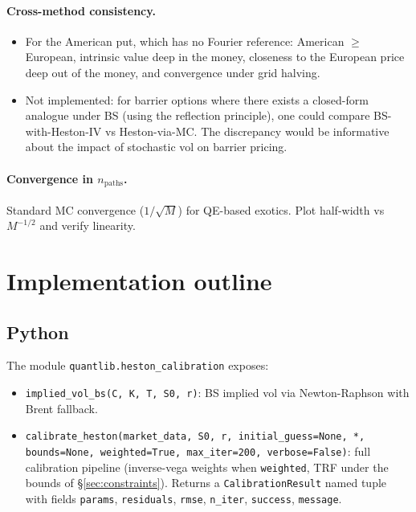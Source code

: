 \documentclass[11pt]{article}
\theoremstyle{plain}
\theoremstyle{definition}
\theoremstyle{remark}
\begin{document}
\paragraph{Cross-method consistency.}
\begin{itemize}[topsep=2pt]
    \item For the American put, which has no Fourier reference: American $\geq$ European, intrinsic value deep in the money, closeness to the European price deep out of the money, and convergence under grid halving.
    \item Not implemented: for barrier options where there exists a closed-form analogue under BS (using the reflection principle), one could compare BS-with-Heston-IV vs Heston-via-MC. The discrepancy would be informative about the impact of stochastic vol on barrier pricing.
\end{itemize}

\paragraph{Convergence in $n_{\mathrm{paths}}$.} Standard MC convergence ($1/\sqrt{M}$) for QE-based exotics. Plot half-width vs $M^{-1/2}$ and verify linearity.

\section{Implementation outline}
\begingroup\sloppy %

\subsection{Python}

The module \texttt{quantlib.heston\_calibration} exposes:
\begin{itemize}[topsep=2pt]
    \item \texttt{implied\_vol\_bs(C, K, T, S0, r)}: BS implied vol via Newton-Raphson with Brent fallback.
    \item \texttt{calibrate\_heston(market\_data, S0, r, initial\_guess=None, *, bounds=None, weighted=True, max\_iter=200, verbose=False)}: full calibration pipeline (inverse-vega weights when \texttt{weighted}, TRF under the bounds of \S\ref{sec:constraints}). Returns a \texttt{CalibrationResult} named tuple with fields \texttt{params}, \texttt{residuals}, \texttt{rmse}, \texttt{n\_iter}, \texttt{success}, \texttt{message}.
\end{itemize}
\end{document}
